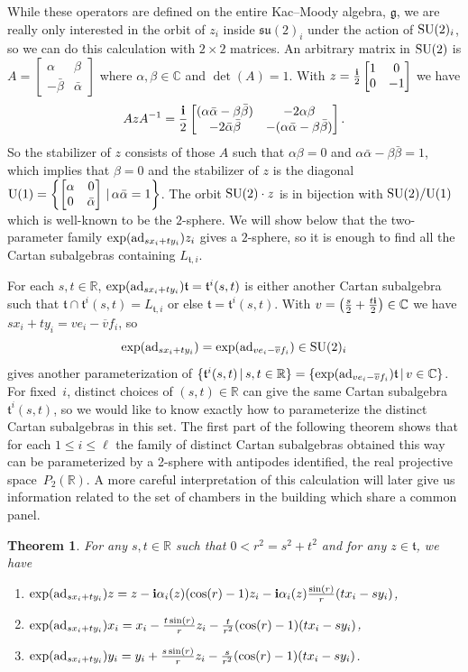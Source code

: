 \documentclass[pdftex]{sigma}
\numberwithin{equation}{section}
\newtheorem{Theorem}{Theorem}[section]
\def\C{{\mathbb C}}
\def\R{\mathbb{R}}
\def\a{\alpha}
\def\bet{\beta}
\def\bm{\begin{bmatrix}}
\def\ebm{\end{bmatrix}}
\def\bi{{\bf i}}
\def\fg{\mathfrak{g}}
\def\ft{\mathfrak{t}}
\def\fsu{\mathfrak{su}}
\begin{document}
While these operators are defined on the entire Kac--Moody algebra, $\fg$, we are really only interested in the orbit of $z_i$ inside $\fsu(2)_i$ under the action of ${\rm SU}(2)_i$, so we can do this calculation with $2\times 2$ matrices. An arbitrary matrix in ${\rm SU}(2)$ is
$A = \bm \a&\bet\\ -\bar\bet&\bar\a\ebm$ where $\a,\bet\in\C$ and $\det(A) = 1$. With $z = \frac{\bi}{2} \bm 1&0\\0&-1\ebm$ we have
\[AzA^{-1} = \frac{\bi}{2} \bm (\a\bar\a-\bet\bar\bet)&-2\a\bet \\-2\bar\a\bar\bet&-(\a\bar\a-\bet\bar\bet)\ebm.\]
So the stabilizer of $z$ consists of those $A$ such that $\a\bet = 0$ and $\a\bar\a-\bet\bar\bet = 1$, which implies that $\bet = 0$ and
the stabilizer of $z$ is the diagonal ${\rm U}(1) = \left\{\bm \a&0\\ 0&\bar\a\ebm \,|\, \a\bar\a = 1\right\}$. The orbit ${\rm SU}(2)\cdot z$ is in
bijection with ${\rm SU}(2)/{\rm U}(1)$ which is well-known to be the $2$-sphere. We will show below that the two-parameter family
$\exp({\rm ad}_{sx_i+ty_i})z_i$ gives a $2$-sphere, so it is enough to find all the Cartan subalgebras containing $L_{\ft,i}$.

For each $s,t\in\R$, $\exp({\rm ad}_{sx_i+ty_i})\ft = \ft^i(s,t)$ is either another Cartan subalgebra such that $\ft\cap\ft^i(s,t) = L_{\ft,i}$ or else
$\ft = \ft^i(s,t)$. With $v=\big(\frac{s}{2}+\frac{t\bi}{2}\big)\in\C$ we have $sx_i+ty_i = v e_i-\overline{v}f_i$, so
\[\exp({\rm ad}_{sx_i+ty_i}) = \exp({\rm ad}_{v e_i-\overline{v}f_i}) \in {\rm SU}(2)_i\]
gives another parameterization of $\{\ft^i(s,t)\, |\, s,t\in\R\} = \{ \exp({\rm ad}_{v e_i-\overline{v}f_i})\ft\, |\, v\in\C\}$. For fixed~$i$, distinct choices of $(s,t)\in\R$ can give the same Cartan subalgebra $\ft^i(s,t)$, so we would like to know exactly how to
parameterize the distinct Cartan subalgebras in this set. The first part of the following theorem shows that for each $1\leq i \leq \ell$ the family of distinct Cartan subalgebras obtained this way can be parameterized by a 2-sphere with antipodes identified, the real projective space~$P_2(\R)$. A more careful interpretation of this calculation will later give us information related to the set of chambers in the building which share a common panel.

\begin{Theorem} \label{theorem:expformulas} For any $s,t\in\R$ such that $0 < r^2 = s^2 + t^2$
and for any $z\in\ft$, we have
\begin{enumerate}\itemsep=0pt
\item[$1)$] $\exp({\rm ad}_{sx_i+ty_i}) z = z - {\bi}\alpha_i(z) (\cos(r)-1) z_i - {\bi}\alpha_i(z) \frac{\sin(r)}{r} (tx_i-sy_i)$,
\item[$2)$] $\exp({\rm ad}_{sx_i+ty_i}) x_i = x_i - \frac{t\sin(r)}{r} z_i - \frac{t}{r^2} (\cos(r) - 1) (tx_i-sy_i)$,
\item[$3)$] $\exp({\rm ad}_{sx_i+ty_i}) y_i = y_i + \frac{s\sin(r)}{r} z_i - \frac{s}{r^2} (\cos(r) - 1) (tx_i-sy_i)$.
\end{enumerate}
\end{Theorem}
\end{document}
